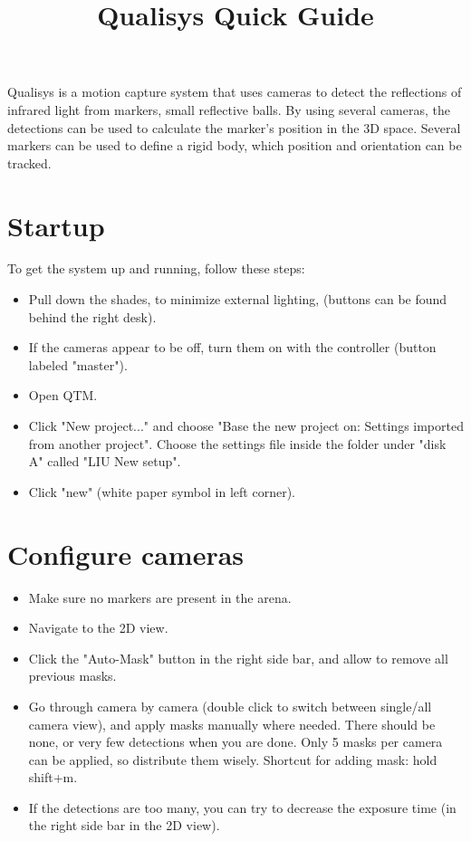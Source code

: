 \documentclass{article}
\title{Qualisys Quick Guide}
\begin{document}
\maketitle

Qualisys is a motion capture system that uses cameras to detect the reflections of infrared light from markers, small reflective balls. By using several cameras, the detections can be used to calculate the marker's position in the 3D space. Several markers can be used to define a rigid body, which position and orientation can be tracked.

\section{Startup}
\label{startup}
To get the system up and running, follow these steps:

\begin{itemize}
    \item Pull down the shades, to minimize external lighting, (buttons can be found behind the right desk).
    \item If the cameras appear to be off, turn them on with the controller (button labeled "master").
    \item Open QTM.
    \item Click "New project..." and choose "Base the new project on: Settings imported from another project". Choose the settings file inside the folder under "disk A" called "LIU New setup".
    \item Click "new" (white paper symbol in left corner).
\end{itemize}

\section{Configure cameras}
\begin{itemize}
    \item Make sure no markers are present in the arena.
    \item Navigate to the 2D view.
    \item Click the "Auto-Mask" button in the right side bar, and allow to remove all previous masks. 
    \item Go through camera by camera (double click to switch between single/all camera view), and apply masks manually where needed. There should be none, or very few detections when you are done. Only 5 masks per camera can be applied, so distribute them wisely. Shortcut for adding mask: hold shift+m.
    \item If the detections are too many, you can try to decrease the exposure time (in the right side bar in the 2D view).
\end{itemize}
\end{document}
